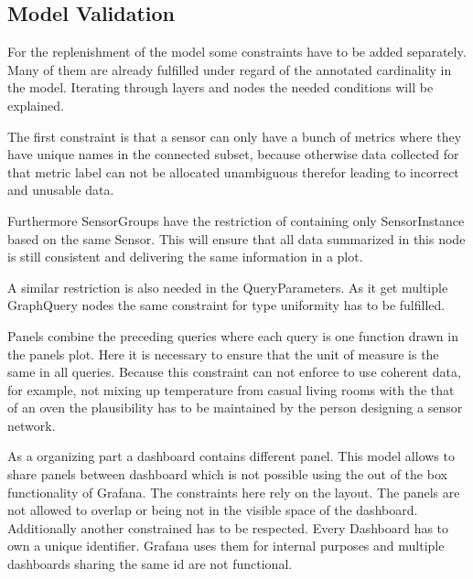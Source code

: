 \subsection{Model Validation}
For the replenishment of the model some constraints have to be added separately. Many of them are already fulfilled under regard of the annotated cardinality in the model. Iterating through layers and nodes the needed conditions will be explained. 

The first constraint is that a sensor can only have a bunch of metrics where they have unique names in the connected subset, because otherwise data collected for that metric label can not be allocated unambiguous therefor leading to incorrect and unusable data. 

Furthermore SensorGroups have the restriction of containing only SensorInstance based on the same Sensor. This will ensure that all data summarized in this node is still consistent and delivering the same information in a plot.

A similar restriction is also needed in the QueryParameters. As it get multiple GraphQuery nodes the same constraint for type uniformity has to be fulfilled.

Panels combine the preceding queries where each query is one function drawn in the panels plot. Here it is necessary to ensure that the unit of measure is the same in all queries. Because this constraint can not enforce to use coherent data, for example, not mixing up temperature from casual living rooms with the that of an oven the plausibility has to be maintained by the person designing a sensor network.

As a organizing part a dashboard contains different panel. This model allows to share panels between dashboard which is not possible using the out of the box functionality of Grafana. The constraints here rely on the layout. The panels are not allowed to overlap or being not in the visible space of the dashboard. Additionally another constrained has to be respected. Every Dashboard has to own a unique identifier. Grafana uses them for internal purposes and multiple dashboards sharing the same id are not functional.



